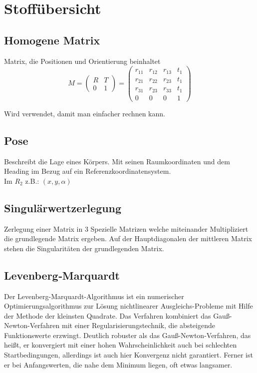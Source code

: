 \chapter{Stoffübersicht}
\label{chp:stoffübersicht}

\section{Homogene Matrix}	
\label{chp:stoffübersicht:sec:homogeneMatrix}
Matrix, die Positionen und Orientierung beinhaltet 
\begin{equation}
M = 
\left(
\begin{array}{cc}
R & T\\
0 & 1
\end{array}
\right)
=
\left(
\begin{array}{cccc}
r_{11} & r_{12} & r_{13} & t_{1} \\
r_{21} & r_{22} & r_{23} & t_{1} \\
r_{31} & r_{23} & r_{33} & t_{1} \\
0 	   & 0    & 0    & 1  
\end{array}
\right)	
\end{equation}

Wird verwendet, damit man einfacher rechnen kann.

\section{Pose}	
\label{chp:stoffübersicht:sec:pose}
Beschreibt die Lage eines Körpers. Mit seinen Raumkoordinaten und dem Heading im Bezug auf ein Referenzkoordinatensystem. \\
Im $R_2$ z.B.: $(x, y, \alpha)$

\section{Singulärwertzerlegung}	
\label{chp:stoffübersicht:sec:singulärwertzerlegung}
Zerlegung einer Matrix in 3 Spezielle Matrizen welche miteinander Multipliziert die grundlegende Matrix ergeben. Auf der Hauptdiagonalen der mittleren Matrix stehen die Singularitäten der grundlegenden Matrix. 

\section{Levenberg‐Marquardt}
\label{chp:stoffübersicht:sec:Levenberg‐Marquardt}
Der Levenberg-Marquardt-Algorithmus ist ein numerischer Optimierungsalgorithmus zur Lösung nichtlinearer Ausgleichs-Probleme mit
Hilfe der Methode der kleinsten Quadrate. Das Verfahren kombiniert das Gauß-Newton-Verfahren mit einer Regularisierungstechnik, die
absteigende Funktionswerte erzwingt. Deutlich robuster als das Gauß-Newton-Verfahren, das heißt, er konvergiert mit einer hohen
Wahrscheinlichkeit auch bei schlechten Startbedingungen, allerdings ist auch hier Konvergenz nicht garantiert. Ferner ist er bei
Anfangswerten, die nahe dem Minimum liegen, oft etwas langsamer. 


